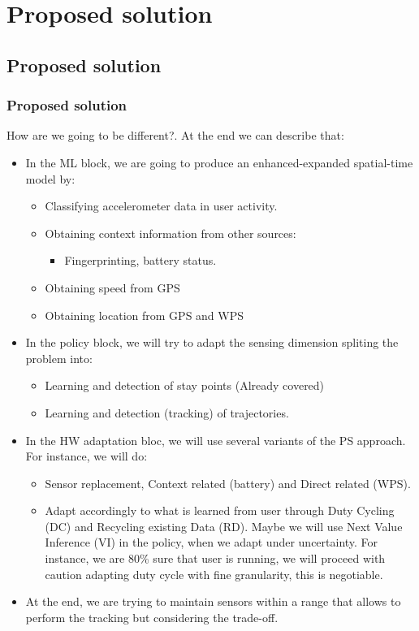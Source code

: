 \documentclass[compress,9pt,xcolor={dvipsnames,table}]{beamer}
\begin{document}
\section{Proposed solution}
\subsection{Proposed solution}
\begin{frame}[t]\frametitle{Proposed solution}
How are we going to be different?.
At the end we can describe that:
\begin{itemize}
  \item In the ML block, we are going to produce an enhanced-expanded spatial-time model by:
  \begin{itemize}
    \item Classifying accelerometer data in user activity.
    \item Obtaining context information from other sources:
    \begin{itemize}
      \item Fingerprinting, battery status.
    \end{itemize}
    \item Obtaining speed from GPS
    \item Obtaining location from GPS and WPS
  \end{itemize}
  \item In the policy block, we will try to adapt the sensing dimension spliting the problem into:
  \begin{itemize}
    \item Learning and detection of stay points (Already covered)
    \item Learning and detection (tracking) of trajectories.
  \end{itemize}
  \item In the HW adaptation bloc, we will use several variants of the PS approach.
  For instance, we will do:
  \begin{itemize}
    \item Sensor replacement, Context related (battery) and Direct related (WPS).
    \item Adapt accordingly to what is learned from user through Duty Cycling (DC) and Recycling existing Data (RD).
    Maybe we will use Next Value Inference (VI) in the policy, when we adapt under uncertainty.
    For instance, we are 80\% sure that user is running, we will proceed with caution adapting duty cycle with fine granularity, this is negotiable.
  \end{itemize}
  \item At the end, we are trying to maintain sensors within a range that allows to perform the tracking but considering the trade-off.
\end{itemize}
\end{frame}
\end{document}

